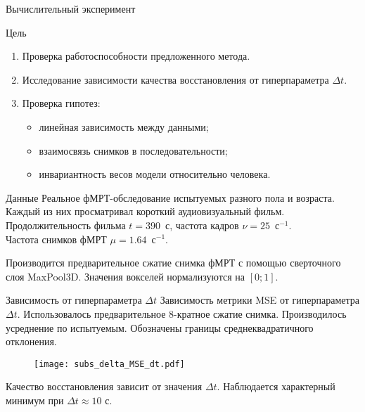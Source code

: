\documentclass[10pt]{beamer}
\begin{document}
\begin{frame}{Вычислительный эксперимент}
    \begin{block}{Цель}
        \begin{enumerate}
            \item Проверка работоспособности предложенного метода.
            \item Исследование зависимости качества восстановления от гиперпараметра $\Delta t$.
            \item Проверка гипотез:
                    \begin{itemize}
                        \item линейная зависимость между данными;
                        \item взаимосвязь снимков в последовательности;
                        \item инвариантность весов модели относительно человека.
                    \end{itemize}
        \end{enumerate}
    \end{block}
    \vspace{-0.2cm}
    \begin{block}{Данные}
        Реальное фМРТ-обследование испытуемых разного пола и возраста.
        Каждый из них просматривал короткий аудиовизуальный фильм.
        Продолжительность фильма $t = 390$~с, частота кадров $\nu = 25$~$\text{с}^{-1}$.\\
        Частота снимков фМРТ $\mu = 1.64$~$\text{с}^{-1}$.
    \end{block}
    \vspace{-0.1cm}
    Производится предварительное сжатие снимка фМРТ с помощью сверточного слоя MaxPool3D.
	Значения вокселей нормализуются на $[0; 1]$.
\end{frame}
\begin{frame}{Зависимость от гиперпараметра $\Delta t$}
    Зависимость метрики MSE от гиперпараметра $\Delta t$.
    Использовалось предварительное 8-кратное сжатие снимка.
    Производилось усреднение по испытуемым.
	Обозначены границы среднеквадратичного отклонения.
    \begin{figure}[h!]
		\centering
		\texttt{[image: subs\_delta\_MSE\_dt.pdf]}
		\label{fig:3}
	\end{figure}
    \vspace{-0.2cm}
    Качество восстановления зависит от значения $\Delta t$. 
    Наблюдается характерный минимум при $\Delta t \approx 10 \text{ с}$.
\end{frame}
\end{document}

